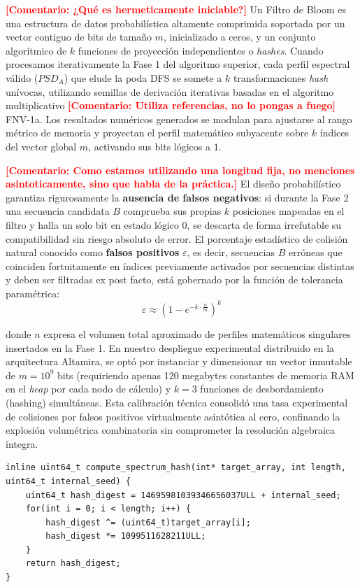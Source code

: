 \documentclass[12pt,a4paper]{tfg_domingo}
\newcommand{\Comentario}[1]{\textcolor{red}{\textbf{[Comentario:
      #1]}}}
\begin{document}
\Comentario{¿Qué es hermeticamente iniciable?}
Un Filtro de Bloom es una estructura de datos probabilística altamente
comprimida soportada por un vector contiguo de bits de tamaño $m$,
inicializado  a ceros, y un conjunto algorítmico de $k$ funciones de
proyección independientes o \textit{hashes}. Cuando procesamos
iterativamente la Fase 1 del algoritmo superior, cada perfil espectral
válido ($PSD_A$) que elude la poda DFS se somete a $k$
transformaciones \textit{hash} unívocas, utilizando semillas de
derivación iterativas basadas en el algoritmo multiplicativo
\Comentario{Utiliza referencias, no lo pongas a fuego}
FNV-1a. Los resultados numéricos generados se modulan para ajustarse
al  rango métrico de memoria y proyectan el perfil matemático
subyacente sobre $k$ índices del vector global $m$, activando sus bits
lógicos a $1$. 


\Comentario{Como estamos utilizando una longitud fija, no menciones asintoticamente, sino que habla de  la práctica.}
El diseño probabilístico garantiza rigurosamente la \textbf{ausencia de falsos negativos}: si durante la Fase 2 una secuencia candidata $B$ comprueba sus propias $k$ posiciones mapeadas en el filtro y halla un solo bit en estado lógico $0$, se descarta de forma irrefutable su compatibilidad sin riesgo absoluto de error. El porcentaje estadístico de colisión natural conocido como \textbf{falsos positivos} $\varepsilon$, es decir, secuencias $B$ erróneas que coinciden fortuitamente en índices previamente activados por secuencias distintas y deben ser filtradas ex post facto, está gobernado  por la función de tolerancia paramétrica:
$$ \varepsilon \approx \left( 1 - e^{-k \cdot \frac{n}{m}} \right)^k $$

donde $n$ expresa el volumen total aproximado de perfiles matemáticos
singulares insertados en la Fase 1. En nuestro despliegue experimental
distribuido en la arquitectura Altamira, se optó por  instanciar y
dimensionar un vector inmutable de $m = 10^9$ bits (requiriendo apenas
120 megabytes constantes de memoria RAM en el \emph{heap} por  cada
nodo de cálculo) y $k = 3$ funciones de desbordamiento (hashing)
simultáneas. Esta calibración técnica consolidó una tasa  experimental
de colisiones por falsos positivos virtualmente asintótica al cero,
confinando la explosión volumétrica combinatoria sin  comprometer la resolución algebraica íntegra.

\begin{lstlisting}[caption={Generador de proyecciones Hash paramétricas (FNV-1a) para su uso vectorizado en Filtros de Bloom concurrentes}, label={lst:bloom_hash}]
inline uint64_t compute_spectrum_hash(int* target_array, int length, uint64_t internal_seed) {
    uint64_t hash_digest = 14695981039346656037ULL + internal_seed;
    for(int i = 0; i < length; i++) {
        hash_digest ^= (uint64_t)target_array[i];
        hash_digest *= 1099511628211ULL;
    }
    return hash_digest;
}
\end{lstlisting}
\end{document}
